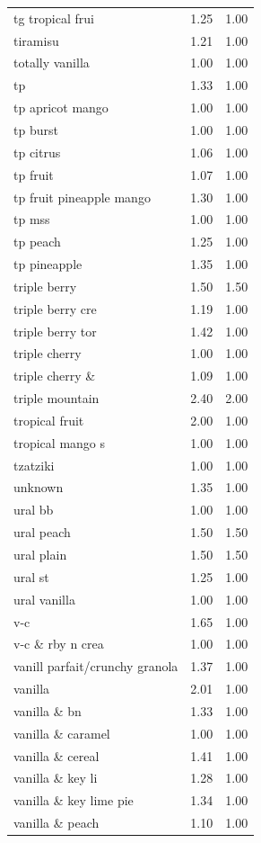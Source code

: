 \begin{table}
\begin{tabular}{lrr}
tg tropical frui & 1.25 & 1.00 \\
tiramisu & 1.21 & 1.00 \\
totally vanilla & 1.00 & 1.00 \\
tp & 1.33 & 1.00 \\
tp apricot mango & 1.00 & 1.00 \\
tp burst & 1.00 & 1.00 \\
tp citrus & 1.06 & 1.00 \\
tp fruit & 1.07 & 1.00 \\
tp fruit pineapple mango & 1.30 & 1.00 \\
tp mss & 1.00 & 1.00 \\
tp peach & 1.25 & 1.00 \\
tp pineapple & 1.35 & 1.00 \\
triple berry & 1.50 & 1.50 \\
triple berry cre & 1.19 & 1.00 \\
triple berry tor & 1.42 & 1.00 \\
triple cherry & 1.00 & 1.00 \\
triple cherry \& & 1.09 & 1.00 \\
triple mountain & 2.40 & 2.00 \\
tropical fruit & 2.00 & 1.00 \\
tropical mango s & 1.00 & 1.00 \\
tzatziki & 1.00 & 1.00 \\
unknown & 1.35 & 1.00 \\
ural bb & 1.00 & 1.00 \\
ural peach & 1.50 & 1.50 \\
ural plain & 1.50 & 1.50 \\
ural st & 1.25 & 1.00 \\
ural vanilla & 1.00 & 1.00 \\
v-c & 1.65 & 1.00 \\
v-c \& rby n crea & 1.00 & 1.00 \\
vanill parfait/crunchy granola & 1.37 & 1.00 \\
vanilla & 2.01 & 1.00 \\
vanilla \& bn & 1.33 & 1.00 \\
vanilla \& caramel & 1.00 & 1.00 \\
vanilla \& cereal & 1.41 & 1.00 \\
vanilla \& key li & 1.28 & 1.00 \\
vanilla \& key lime pie & 1.34 & 1.00 \\
vanilla \& peach & 1.10 & 1.00 \\

\end{tabular}
\end{table}
